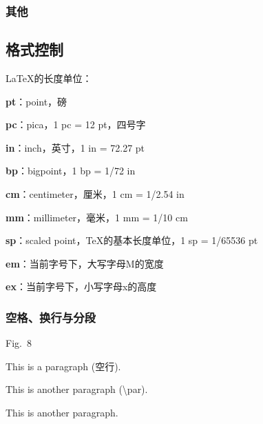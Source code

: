         \subsubsection{其他}
    
    \subsection{格式控制}
            \LaTeX 的长度单位：

            \textbf{pt}：point，磅

            \textbf{pc}：pica，1 pc = 12 pt，四号字

            \textbf{in}：inch，英寸，1 in = 72.27 pt

            \textbf{bp}：bigpoint，1 bp = 1/72 in

            \textbf{cm}：centimeter，厘米，1 cm = 1/2.54 in

            \textbf{mm}：millimeter，毫米，1 mm = 1/10 cm

            \textbf{sp}：scaled point，\TeX 的基本长度单位，1 sp = 1/65536 pt

            \textbf{em}：当前字号下，大写字母M的宽度

            \textbf{ex}：当前字号下，小写字母x的高度


        \subsubsection{空格、换行与分段}
            Fig.~8

            This is a paragraph (空行). 
            
            This is another paragraph (\textbackslash par). 
            \par This is another paragraph. 


